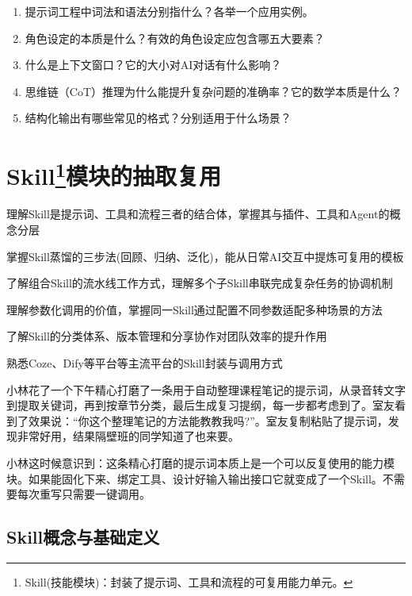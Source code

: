 \begin{enumerate}
\setlength{\itemsep}{6pt}
\item 提示词工程中词法和语法分别指什么？各举一个应用实例。
\item 角色设定的本质是什么？有效的角色设定应包含哪五大要素？
\item 什么是上下文窗口？它的大小对AI对话有什么影响？
\item 思维链（CoT）推理为什么能提升复杂问题的准确率？它的数学本质是什么？
\item 结构化输出有哪些常见的格式？分别适用于什么场景？
\end{enumerate}

\newpage

\section[Skill模块的抽取复用]{\textbf{Skill}\footnote{Skill(技能模块)：封装了提示词、工具和流程的可复用能力单元。}模块的抽取复用}

\begin{sectionkeypoints}
\item 理解Skill是提示词、工具和流程三者的结合体，掌握其与插件、工具和Agent的概念分层
\item 掌握Skill蒸馏的三步法(回顾、归纳、泛化)，能从日常AI交互中提炼可复用的模板
\item 了解组合Skill的流水线工作方式，理解多个子Skill串联完成复杂任务的协调机制
\item 理解参数化调用的价值，掌握同一Skill通过配置不同参数适配多种场景的方法
\item 了解Skill的分类体系、版本管理和分享协作对团队效率的提升作用
\item 熟悉Coze、Dify等平台等主流平台的Skill封装与调用方式
\end{sectionkeypoints}




小林花了一个下午精心打磨了一条用于自动整理课程笔记的提示词，从录音转文字到提取关键词，再到按章节分类，最后生成复习提纲，每一步都考虑到了。室友看到了效果说：“你这个整理笔记的方法能教教我吗?”。室友复制粘贴了提示词，发现非常好用，结果隔壁班的同学知道了也来要。

小林这时候意识到：这条精心打磨的提示词本质上是一个可以反复使用的能力模块。如果能固化下来、绑定工具、设计好输入输出接口它就变成了一个Skill。不需要每次重写只需要一键调用。

\subsection{Skill概念与基础定义}

